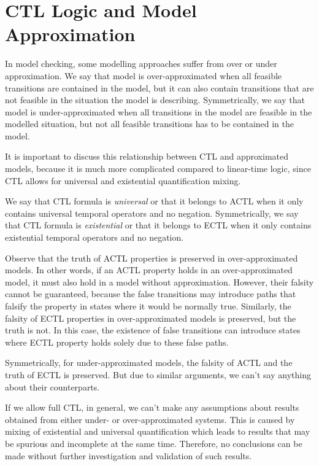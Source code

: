 \documentclass[12pt,oneside]{fithesis2}
\begin{document}
		\section{CTL Logic and Model Approximation}
		
			In model checking, some modelling approaches suffer from over or under approximation. We say that model is over-approximated when all feasible transitions are contained in the model, but it can also contain transitions that are not feasible in the situation the model is describing. Symmetrically, we say that model is under-approximated when all transitions in the model are feasible in the modelled situation, but not all feasible transitions has to be contained in the model. 
			
			It is important to discuss this relationship between CTL and approximated models, because it is much more complicated compared to linear-time logic, since CTL allows for universal and existential quantification mixing.
			
			We say that CTL formula is \emph{universal} or that it belongs to ACTL when it only contains universal temporal operators and no negation. Symmetrically, we say that CTL formula is \emph{existential} or that it belongs to ECTL when it only contains existential temporal operators and no negation.
			
			Observe that the truth of ACTL properties is preserved in over-approximated models. In other words, if an ACTL property holds in an over-approximated model, it must also hold in a model without approximation. However, their falsity cannot be guaranteed, because the false transitions may introduce paths that falsify the property in states where it would be normally true. Similarly, the falsity of ECTL properties in over-approximated models is preserved, but the truth is not. In this case, the existence of false transitions can introduce states where ECTL property holds solely due to these false paths.
			
			Symmetrically, for under-approximated models, the falsity of ACTL and the truth of ECTL is preserved. But due to similar arguments, we can't say anything about their counterparts.
			
			If we allow full CTL, in general, we can't make any assumptions about results obtained from either under- or over-approximated systems. This is caused by mixing of existential and universal quantification which leads to results that may be spurious and incomplete at the same time. Therefore, no conclusions can be made without further investigation and validation of such results.
			
\end{document}
